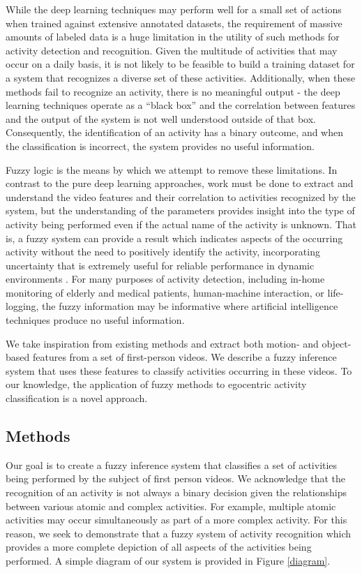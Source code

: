 \documentclass[12pt]{report}
\begin{document}
While the deep learning techniques may perform well for a small set of actions when trained against extensive annotated datasets, the requirement of massive amounts of labeled data is a huge limitation in the utility of such methods for activity detection and recognition. Given the multitude of activities that may occur on a daily basis, it is not likely to be feasible to build a training dataset for a system that recognizes a diverse set of these activities. Additionally, when these methods fail to recognize an activity, there is no meaningful output - the deep learning techniques operate as a “black box” and the correlation between features and the output of the system is not well understood outside of that box. Consequently, the identification of an activity has a binary outcome, and when the classification is incorrect, the system provides no useful information.

Fuzzy logic is the means by which we attempt to remove these limitations. In contrast to the pure deep learning approaches, work must be done to extract and understand the video features and their correlation to activities recognized by the system, but the understanding of the parameters provides insight into the type of activity being performed even if the actual name of the activity is unknown. That is, a fuzzy system can provide a result which indicates aspects of the occurring activity without the need to positively identify the activity, incorporating uncertainty that is extremely useful for reliable performance in dynamic environments \cite{Anderson2009}. For many purposes of activity detection, including in-home monitoring of elderly \cite{Banerjee2015, Anderson2009a} and medical patients, human-machine interaction, or life-logging, the fuzzy information may be informative where artificial intelligence techniques produce no useful information.

We take inspiration from existing methods and extract both motion- and object-based features from a set of first-person videos. We describe a fuzzy inference system that uses these features to classify activities occurring in these videos. To our knowledge, the application of fuzzy methods to egocentric activity classification is a novel approach.


\subsection{Methods}
Our goal is to create a fuzzy inference system that classifies a set of activities being performed by the subject of first person videos. We acknowledge that the recognition of an activity is not always a binary decision given the relationships between various atomic and complex activities. For example, multiple atomic activities may occur simultaneously as part of a more complex activity. For this reason, we seek to demonstrate that a fuzzy system of activity recognition which provides a more complete depiction of all aspects of the activities being performed. A simple diagram of our system is provided in Figure \ref{diagram}.
\end{document}
